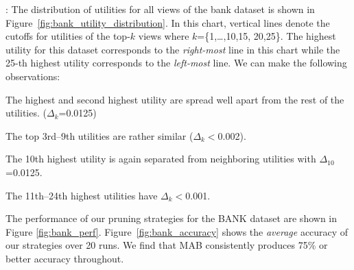 :
The distribution of utilities for all views of the bank dataset is
shown in Figure~\ref{fig:bank_utility_distribution}. 
In this chart, vertical lines denote the cutoffs for utilities of the top-$k$ views
where $k$=\{1,\ldots,10,15, 20,25\}.
The highest utility for this dataset corresponds to the {\it right-most} line
in this chart while the 25-th highest utility corresponds to the {\it left-most}
line. 
We can make the following observations:
\begin{denselist}
\item The highest and second highest utility are spread well apart 
from the rest of the utilities. ($\Delta_k$=0.0125)
\item The top 3rd--9th utilities are rather similar ($\Delta_k<$0.002). 
\item The 10th highest utility is again separated from neighboring utilities with $\Delta_{10}$=0.0125.
\item The 11th--24th highest utilities have $\Delta_k<$0.001.
\end{denselist}
The performance of our pruning strategies for the BANK dataset are shown in Figure 
\ref{fig:bank_perf}.
Figure~\ref{fig:bank_accuracy} shows the {\it average} accuracy of our strategies over 20 runs.
We find that MAB consistently produces 75\% or better accuracy throughout.
